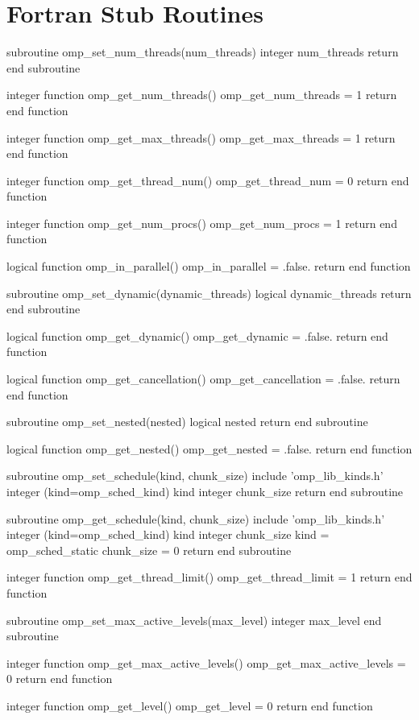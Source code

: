 \section{Fortran Stub Routines}
\label{sec:Fortran Stub Routines}
{\small \begin{ompfFunction}
subroutine omp_set_num_threads(num_threads)
  integer num_threads
  return
end subroutine

integer function omp_get_num_threads()
  omp_get_num_threads = 1
  return
end function

integer function omp_get_max_threads()
  omp_get_max_threads = 1
  return
end function

integer function omp_get_thread_num()
  omp_get_thread_num = 0
  return
end function

integer function omp_get_num_procs()
  omp_get_num_procs = 1
  return
end function

logical function omp_in_parallel()
  omp_in_parallel = .false.
  return
end function

subroutine omp_set_dynamic(dynamic_threads)
  logical dynamic_threads
  return
end subroutine

logical function omp_get_dynamic()
  omp_get_dynamic = .false.
  return
end function

logical function omp_get_cancellation()
  omp_get_cancellation = .false.
  return
end function

subroutine omp_set_nested(nested)
  logical nested
  return
end subroutine

logical function omp_get_nested()
  omp_get_nested = .false.
  return
end function

subroutine omp_set_schedule(kind, chunk_size)
  include 'omp_lib_kinds.h'
  integer (kind=omp_sched_kind) kind
  integer chunk_size
  return
end subroutine

subroutine omp_get_schedule(kind, chunk_size)
  include 'omp_lib_kinds.h'
  integer (kind=omp_sched_kind) kind
  integer chunk_size
  kind = omp_sched_static
  chunk_size = 0
  return
end subroutine

integer function omp_get_thread_limit()
  omp_get_thread_limit = 1
  return
end function

subroutine omp_set_max_active_levels(max_level)
  integer max_level
end subroutine

integer function omp_get_max_active_levels()
  omp_get_max_active_levels = 0
  return
end function

integer function omp_get_level()
  omp_get_level = 0
  return
end function


\end{ompfFunction}}
